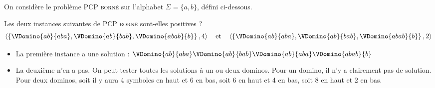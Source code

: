 
\begingroup

\begin{exercice}\label{exo:turingmachines/nondeterministic/pcp}

  On considère le problème \textsc{PCP borné} sur l'alphabet $\Sigma = \{a, b\}$, défini ci-dessous. 
  

  \begin{questions}
  \item Les deux instances suivantes de \textsc{PCP borné} sont-elles positives ? 
    $$
    \left\langle \left\{ \VDomino{ab}{aba}, \VDomino{ab}{bab},  \VDomino{abab}{b}  \right\}, 4 \right\rangle
    \quad\text{et}\quad
    \left\langle \left\{ \VDomino{ab}{aba}, \VDomino{ab}{bab},  \VDomino{abab}{b}  \right\}, 2 \right\rangle
    $$
  \end{questions}
  \begin{corrections}
    \begin{itemize}
    \item La première instance a une solution : $\VDomino{ab}{aba} \VDomino{ab}{bab} \VDomino{ab}{aba}  \VDomino{abab}{b}$
    \item La deuxième n'en a pas. On peut tester toutes les solutions à un ou deux dominos. 
      Pour un domino, il n'y a clairement pas de solution.
      Pour deux dominos, soit il y aura 4 symboles en haut et 6 en bas, soit 6 en haut et 4 en bas, soit 8 en haut et 2 en bas. 
    \end{itemize}
  \end{corrections}


\end{exercice}
